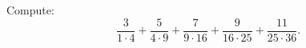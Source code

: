 Compute: \[\dfrac{3}{1\cdot4}+\dfrac{5}{4\cdot9}+\dfrac{7}{9\cdot16}+\dfrac{9}{16\cdot25}+\dfrac{11}{25\cdot36}.\]
